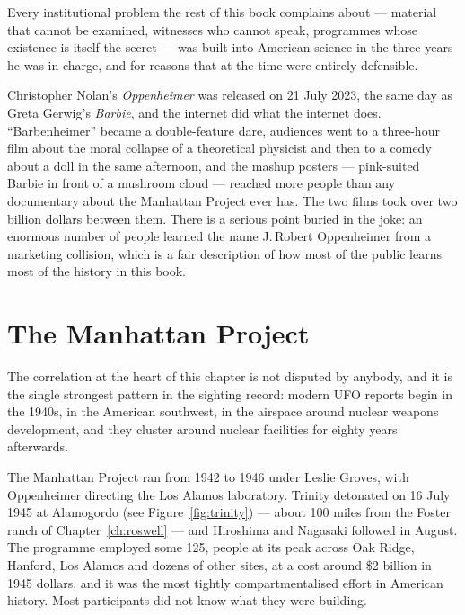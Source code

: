  Every institutional problem the rest of this book complains about
--- material that cannot be examined, witnesses who cannot speak, programmes whose existence is
itself the secret --- was built into American science in the three years he was in charge, and for
reasons that at the time were entirely defensible.

\begin{funfact}
Christopher Nolan's \emph{Oppenheimer} was released on 21 July 2023, the same day as Greta
Gerwig's \emph{Barbie}, and the internet did what the internet does. ``Barbenheimer'' became a
double-feature dare, audiences went to a three-hour film about the moral collapse of a theoretical
physicist and then to a comedy about a doll in the same afternoon, and the mashup posters ---
pink-suited Barbie in front of a mushroom cloud --- reached more people than any documentary about
the Manhattan Project ever has. The two films took over two billion dollars between them. There is
a serious point buried in the joke: an enormous number of people learned the name J.\,Robert
Oppenheimer from a marketing collision, which is a fair description of how most of the public
learns most of the history in this book.
\end{funfact}

\section{The Manhattan Project}\label{sec:manhattanproject}

The correlation at the heart of this chapter is not disputed by anybody, and it is the single
strongest pattern in the sighting record: modern UFO reports begin in the 1940s, in the American
southwest, in the airspace around nuclear weapons development, and they cluster around nuclear
facilities for eighty years afterwards.

The Manhattan Project ran from 1942 to 1946 under Leslie Groves, with Oppenheimer directing the
Los Alamos laboratory. Trinity detonated on 16 July 1945 at Alamogordo (see Figure~\ref{fig:trinity}) --- about 100 miles from
the Foster ranch of Chapter~\ref{ch:roswell} --- and Hiroshima and Nagasaki followed in August. The programme
employed some 125, people at its peak across Oak Ridge, Hanford, Los Alamos and dozens of
other sites, at a cost around \$2 billion in 1945 dollars, and it was the most tightly
compartmentalised effort in American history. Most participants did not know what they were
building.

